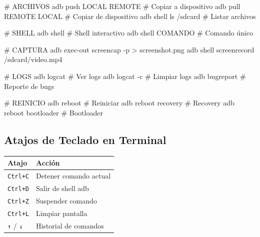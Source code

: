\documentclass[
  doc,
  floatsintext,
  longtable,
  a4paper,
  nolmodern,
  notxfonts,
  notimes,
  12pt,
  colorlinks=true,linkcolor=blue,citecolor=blue,urlcolor=blue]{apa7}
\newenvironment{Shaded}{\begin{snugshade}}{\end{snugshade}}
\newcommand{\AttributeTok}[1]{\textcolor[rgb]{0.40,0.45,0.13}{#1}}
\newcommand{\CommentTok}[1]{\textcolor[rgb]{0.37,0.37,0.37}{#1}}
\newcommand{\ExtensionTok}[1]{\textcolor[rgb]{0.00,0.23,0.31}{#1}}
\newcommand{\NormalTok}[1]{\textcolor[rgb]{0.00,0.23,0.31}{#1}}
\newcommand{\OperatorTok}[1]{\textcolor[rgb]{0.37,0.37,0.37}{#1}}
\newcounter{none} %
\begin{document}
\begin{Shaded}
\begin{Highlighting}[]
\CommentTok{\# ARCHIVOS}
\ExtensionTok{adb}\NormalTok{ push LOCAL REMOTE         }\CommentTok{\# Copiar a dispositivo}
\ExtensionTok{adb}\NormalTok{ pull REMOTE LOCAL         }\CommentTok{\# Copiar de dispositivo}
\ExtensionTok{adb}\NormalTok{ shell ls /sdcard          }\CommentTok{\# Listar archivos}

\CommentTok{\# SHELL}
\ExtensionTok{adb}\NormalTok{ shell                     }\CommentTok{\# Shell interactivo}
\ExtensionTok{adb}\NormalTok{ shell COMANDO             }\CommentTok{\# Comando único}

\CommentTok{\# CAPTURA}
\ExtensionTok{adb}\NormalTok{ exec{-}out screencap }\AttributeTok{{-}p} \OperatorTok{\textgreater{}}\NormalTok{ screenshot.png}
\ExtensionTok{adb}\NormalTok{ shell screenrecord /sdcard/video.mp4}

\CommentTok{\# LOGS}
\ExtensionTok{adb}\NormalTok{ logcat                    }\CommentTok{\# Ver logs}
\ExtensionTok{adb}\NormalTok{ logcat }\AttributeTok{{-}c}                 \CommentTok{\# Limpiar logs}
\ExtensionTok{adb}\NormalTok{ bugreport                 }\CommentTok{\# Reporte de bugs}

\CommentTok{\# REINICIO}
\ExtensionTok{adb}\NormalTok{ reboot                    }\CommentTok{\# Reiniciar}
\ExtensionTok{adb}\NormalTok{ reboot recovery           }\CommentTok{\# Recovery}
\ExtensionTok{adb}\NormalTok{ reboot bootloader         }\CommentTok{\# Bootloader}
\end{Highlighting}
\end{Shaded}

\subsection{Atajos de Teclado en
Terminal}\label{atajos-de-teclado-en-terminal}

{\def\LTcaptype{none} %
\begin{longtable}[]{@{}ll@{}}
\toprule\noalign{}
Atajo & Acción \\
\midrule\noalign{}
\endhead
\bottomrule\noalign{}
\endlastfoot
\texttt{Ctrl+C} & Detener comando actual \\
\texttt{Ctrl+D} & Salir de shell adb \\
\texttt{Ctrl+Z} & Suspender comando \\
\texttt{Ctrl+L} & Limpiar pantalla \\
\texttt{↑} / \texttt{↓} & Historial de comandos \\
\end{longtable}
}
\end{document}
